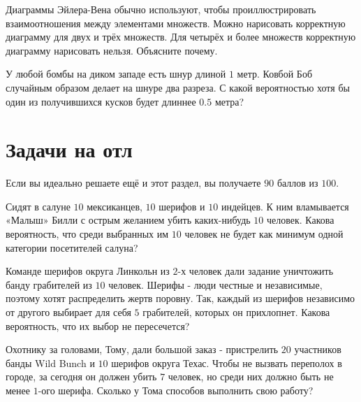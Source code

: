 \documentclass[12pt, a4paper, oneside]{article}
\begin{document}
\newpage

\begin{problem}{5}
    Диаграммы Эйлера-Вена обычно используют, чтобы проиллюстрировать взаимоотношения между элементами множеств. Можно нарисовать корректную диаграмму для двух и трёх множеств. Для четырёх и более множеств корректную диаграмму нарисовать нельзя. Объясните почему. 
\end{problem}

\begin{problem}{5}
    У любой бомбы на диком западе есть шнур длиной $1$ метр. Ковбой Боб случайным образом делает на шнуре два разреза. С какой вероятностью хотя бы один из получившихся кусков будет длиннее $0.5$ метра?
\end{problem}


\section*{Задачи на отл}

Если вы идеально решаете ещё и этот раздел, вы получаете $90$ баллов из $100$.

\begin{problem}{5}
    Сидят в салуне $10$ мексиканцев, $10$ шерифов и $10$ индейцев. К ним вламывается «Малыш» Билли с острым желанием убить каких-нибудь $10$ человек. Какова вероятность, что среди выбранных им $10$ человек не будет как минимум одной категории посетителей салуна?
\end{problem}

\begin{problem}{5}
    Команде шерифов округа Линкольн из $2$-х человек дали задание уничтожить банду грабителей из $10$ человек. Шерифы - люди честные и независимые, поэтому хотят распределить жертв поровну. Так, каждый из шерифов независимо от другого выбирает для себя $5$ грабителей, которых он прихлопнет. Какова вероятность, что их выбор не пересечется?
\end{problem}

\begin{problem}{5}
    Охотнику за головами, Тому, дали большой заказ - пристрелить $20$ участников банды Wild Bunch и $10$ шерифов округа Техас. Чтобы не вызвать переполох в городе, за сегодня он должен убить $7$ человек, но среди них должно быть не менее $1$-ого шерифа. Сколько у Тома способов выполнить свою работу?
\end{problem}
\end{document}

